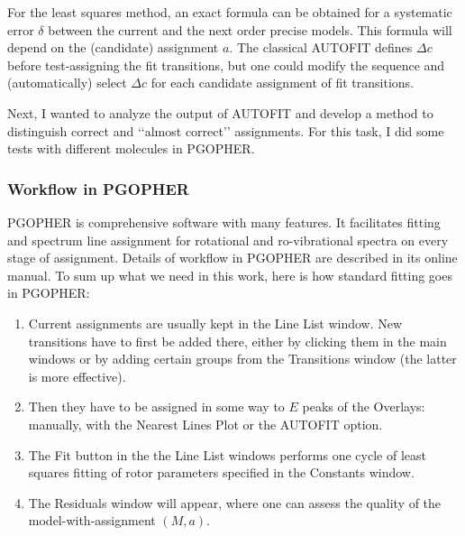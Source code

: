 \documentclass[11pt]{article}
\begin{document}
For the least squares method, an exact formula can be obtained for a systematic error $\delta$ between the current and the next order precise models. This formula will depend on the (candidate) assignment $a$. The classical AUTOFIT defines $\Delta c$ before test-assigning the fit transitions, but one could modify the sequence and (automatically) select $\Delta c$ for each candidate assignment of fit transitions.  



Next, I wanted to analyze the output of AUTOFIT and develop a method to distinguish correct and \lq\lq{}almost correct\rq\rq{} assignments. For this task, I did some tests with different molecules in PGOPHER. 

\subsubsection{Workflow in PGOPHER}

PGOPHER is comprehensive software with many features. It facilitates fitting and spectrum line assignment for rotational and ro-vibrational spectra on every stage of assignment. Details of workflow in PGOPHER are described in its online manual. To sum up what we need in this work, here is how standard fitting goes in PGOPHER: 
\begin{enumerate}
	\item Current assignments are usually kept in the Line List window. New transitions have to first be added there, either by clicking them in the main windows or by adding certain groups from the Transitions window (the latter is more effective). 
	\item Then they have to be assigned in some way to $E$ peaks of the Overlays: manually, with the Nearest Lines Plot or the AUTOFIT option.
	\item The Fit button in the the Line List windows performs one cycle of least squares fitting of rotor parameters specified in the Constants window.
	\item The Residuals window will appear, where one can assess the quality of the model-with-assignment $(M, a)$.
\end{enumerate}
\end{document}
